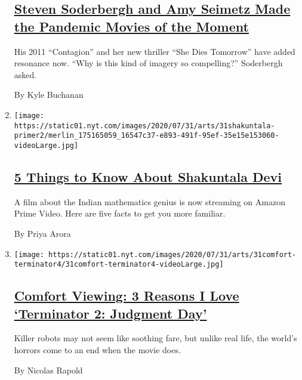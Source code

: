 \begin{enumerate}
{  \subsection{\texorpdfstring{\href{/2020/07/31/movies/steven-soderbergh-amy-seimetz-pandemic.html}{Steven
  Soderbergh and Amy Seimetz Made the Pandemic Movies of the
  Moment}}{Steven Soderbergh and Amy Seimetz Made the Pandemic Movies of the Moment}}\label{steven-soderbergh-and-amy-seimetz-made-the-pandemic-movies-of-the-moment}}

  His 2011 ``Contagion'' and her new thriller ``She Dies Tomorrow'' have
  added resonance now. ``Why is this kind of imagery so compelling?''
  Soderbergh asked.

  By Kyle Buchanan
\item
  \texttt{[image: https://static01.nyt.com/images/2020/07/31/arts/31shakuntala-primer2/merlin\_175165059\_16547c37-e893-491f-95ef-35e15e153060-videoLarge.jpg]}

  \hypertarget{5-things-to-know-about-shakuntala-devi}{%
  \subsection{\texorpdfstring{\href{/2020/07/31/movies/shakuntala-devi-movie.html}{5
  Things to Know About Shakuntala
  Devi}}{5 Things to Know About Shakuntala Devi}}\label{5-things-to-know-about-shakuntala-devi}}

  A film about the Indian mathematics genius is now streaming on Amazon
  Prime Video. Here are five facts to get you more familiar.

  By Priya Arora
\item
  \texttt{[image: https://static01.nyt.com/images/2020/07/31/arts/31comfort-terminator4/31comfort-terminator4-videoLarge.jpg]}

  \hypertarget{comfort-viewing-3-reasons-i-love-terminator-2-judgment-day}{%
  \subsection{\texorpdfstring{\href{/2020/07/31/movies/comfort-viewing-terminator-2.html}{Comfort
  Viewing: 3 Reasons I Love `Terminator 2: Judgment
  Day'}}{Comfort Viewing: 3 Reasons I Love `Terminator 2: Judgment Day'}}\label{comfort-viewing-3-reasons-i-love-terminator-2-judgment-day}}

  Killer robots may not seem like soothing fare, but unlike real life,
  the world's horrors come to an end when the movie does.

  By Nicolas Rapold
\end{enumerate}

